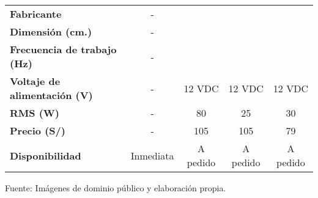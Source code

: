 \begin{itemize}
\begin{mytable}[H]
\begin{tabular}{l|c|c|c|c|}
\begin{minipage}{\mythirdmaxsizeofcontenttable}
			\end{minipage}  \\ \hline
			\multicolumn{1}{|l|}{\textbf{Fabricante}}              & -                                                                     &                 &             &                    \\ \hline
			\multicolumn{1}{|l|}{\textbf{Dimensión (cm.)}}         & -                                                                     &                 &             &                    \\ \hline
			\multicolumn{1}{|l|}{				
				\begin{minipage}{\myforthmaxsizeofcontenttable}	
					\textbf{Frecuencia de trabajo (Hz)}
				\end{minipage}
			}   & -                                                                     &                 &             &                    \\ \hline
			\multicolumn{1}{|l|}{
				\begin{minipage}{\myforthmaxsizeofcontenttable}	
					\textbf{Voltaje de alimentación (V)}
				\end{minipage}
			} & -                                                                     & 12 VDC          & 12 VDC      & 12 VDC             \\ \hline
			\multicolumn{1}{|l|}{\textbf{RMS (W)}}                 & -                                                                     & 80              & 25          & 30                 \\ \hline
			\multicolumn{1}{|l|}{\textbf{Precio (S/)}}             & -                                                                     & 105             & 105         & 79                 \\ \hline
			\multicolumn{1}{|l|}{\textbf{Disponibilidad}}          & Inmediata                                                             & A pedido        & A pedido    & A pedido           \\ \hline
		\end{tabular}
		\begin{flushleft}	
			Fuente: Imágenes de dominio público y elaboración propia.
		\end{flushleft}
	\end{mytable}
	
\end{itemize}



